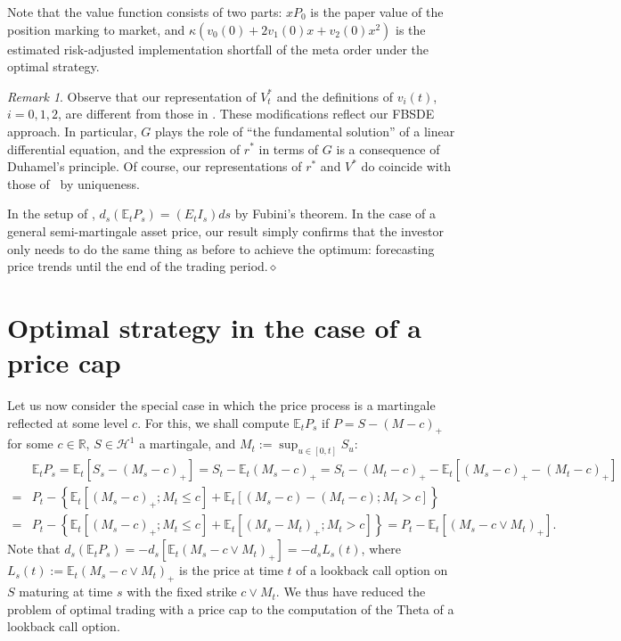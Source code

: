 \documentclass[openany,oneside]{article}
\theoremstyle{definition}
\theoremstyle{remark}
\newtheorem{rem}[thm]{Remark}
\newcommand{\E}{\mathbb{E}} %
\newcommand{\close}{\hspace*{\fill}$\diamond$}
\begin{document}
Note that the value function consists of two parts: $xP_0$ is the paper value of the position marking to market, and $\kappa(v_0(0)+2v_1(0)x+v_2(0)x^2)$ is the estimated risk-adjusted implementation shortfall of the meta order under the optimal strategy.

\begin{rem}
Observe that our representation of $V^\ast_t$ and the definitions of $v_i(t)$, $i=0,1,2$, are different from those in \cite{lehalle2017incorporating}. These modifications reflect our FBSDE approach. In particular, $G$ plays the role of ``the fundamental solution'' of a linear differential equation, and the expression of $r^\ast$ in terms of $G$ is a consequence of Duhamel's principle. Of course, our representations of $r^\ast$ and $V^\ast$ do coincide with those of~\cite{lehalle2017incorporating} by uniqueness.

In the setup of \cite{lehalle2017incorporating}, $d_s(\E_t P_s) = (E_t I_s)ds$ by Fubini's theorem. In the case of a general semi-martingale asset price, our result simply confirms that the investor only needs to do the same thing as before to achieve the optimum: forecasting price trends until the end of the trading period.\close
\end{rem}



\section{Optimal strategy in the case of a price cap}
Let us now consider the special case in which the price process is a martingale reflected at some level $c$. For this, we shall compute $\E_t P_s$ if $P=S-(M-c)_+$ for some $c\in\mathbb{R}$, $S\in\mathcal{H}^1$ a martingale, and $M_t:=\sup_{u\in[0,t]}S_u$:
\begin{align*}
& \E_t P_s = \E_t[S_s-(M_s-c)_+] = S_t-\E_t(M_s-c)_+ = S_t-(M_t-c)_+ - \E_t\left[(M_s-c)_+ - (M_t-c)_+\right] \\
=& P_t -\left\{ \E_t\left[(M_s-c)_+; M_t\le c\right] + \E_t\left[(M_s-c)-(M_t-c); M_t > c\right] \right\} \\
=& P_t -\left\{ \E_t\left[(M_s-c)_+; M_t\le c\right] + \E_t\left[(M_s-M_t)_+; M_t > c\right] \right\} = P_t - \E_t\left[(M_s-c\vee M_t)_+\right].
\end{align*}
Note that $d_s(\E_t P_s) = -d_s\left[\E_t(M_s-c\vee M_t)_+\right] = -d_s L_s(t)$, where $L_s(t):=\E_t(M_s-c\vee M_t)_+$ is the price at time $t$ of a lookback call option on $S$ maturing at time $s$ with the fixed strike $c\vee M_t$. We thus have reduced the problem of optimal trading with a price cap to the computation of the Theta of a lookback call option.
\end{document}
